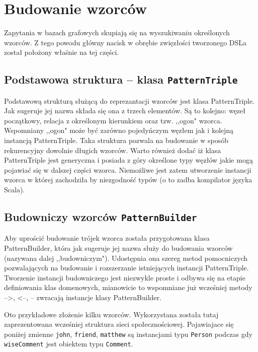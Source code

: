 \documentclass[brudnopis]{xmgr}
\begin{document}
\section{Budowanie wzorców}

Zapytania w bazach grafowych skupiają się na wyszukiwaniu określonych wzorców. Z tego powodu główny nacisk w obrębie zwięzłości tworzonego DSLa został położony właśnie na tej części.

\subsection{Podstawowa struktura -- klasa \texttt{PatternTriple}}
Podstawową strukturą służącą do reprezantacji wzorców jest klasa PatternTriple. Jak sugeruje jej nazwa składa się ona z trzech elementów. Są to kolejno: węzeł początkowy, relacja z określonym kierunkiem oraz tzw. ,,ogon" wzorca. Wspomniany ,,ogon" może być zarówno pojedyńczym węzłem jak i kolejną instancją PatternTriple. Taka struktura pozwala na budowanie w sposób rekurencyjny dowolnie długich wzorców. Warto również dodać iż klasa PatternTriple jest generyczna i posiada z góry określone typy węzłów jakie mogą pojawiać się w dalszej części wzorca.  Niemożliwe jest zatem utworzenie instancji wzorca w której zachodziła by niezgodność typów (o to zadba kompilator języka Scala).

\subsection{Budowniczy wzorców \texttt{PatternBuilder}}
Aby uprościć budowanie trójek wzorca została przygotowana klasa PatternBuilder, która jak sugeruje jej nazwa służy do budowania wzorców (nazywana dalej ,,budowniczym"). Udostępnia ona szereg metod pomocniczych pozwalających na budowanie i rozszerzanie istniejących instancji PatternTriple. Tworzenie instancji budowniczego jest niezwykle proste i odbywa się na etapie definiowania klas domenowych, mianowicie to wspomniane już wcześniej metody -->, <--, -- zwracają instancje klasy PatternBuilder.

Oto przykładowe złożenie kilku wzorców. Wykorzystana została tutaj zaprezentowana wcześniej struktura sieci społecznościowej. Pojawiajace się poniżej zmienne \texttt{john}, \texttt{friend}, \texttt{matthew} są instancjami typu \texttt{Person} podczas gdy \texttt{wiseComment} jest obiektem typu \texttt{Comment}.

\inputminted{scala}{listings/scala/dsl/patterns/functional-example-1.scala}
\end{document}
